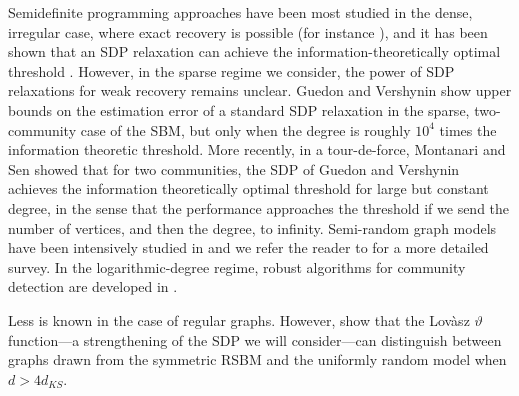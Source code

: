 Semidefinite programming approaches have been most studied in the dense, irregular case, where exact recovery is possible (for instance \cite{abbe2016exact,abbe2015community}), and it has been shown that an SDP relaxation can achieve the information-theoretically optimal threshold \cite{hajek2016achieving}. However, in the sparse regime we consider, the power of SDP relaxations for weak recovery remains unclear. Guedon and Vershynin \cite{guedon2016community} show upper bounds on the estimation error of a standard SDP relaxation in the sparse, two-community case of the SBM, but only when the degree is roughly $10^4$ times the information theoretic threshold. More recently, in a tour-de-force,  Montanari and Sen \cite{montanari2015semidefinite} showed that for two communities, the SDP of Guedon and Vershynin achieves the information theoretically optimal threshold for large but constant degree, in the sense that the performance approaches the threshold if we send the number of vertices, and then the degree, to infinity.  Semi-random graph models have been intensively studied in \cite{blum1995coloring, feige2000finding, feige2001heuristics,coja2004coloring,krivelevich2006semirandom,coja2007solving, makarychev2012approximation, chen2014clustering,guedon2016community} and we refer the reader to \cite{makarychev2016learning} for a more detailed survey. In the logarithmic-degree regime, robust algorithms for community detection are developed in \cite{cai2015robust, kumar2010clustering, awasthi2012improved}.

Less is known in the case of regular graphs. However, \cite{banks2017lov} show that the Lov\`{a}sz $\vartheta$ function---a strengthening of the SDP we will consider---can distinguish between graphs drawn from the symmetric RSBM and the uniformly random model when $d > 4d_{KS}$.

